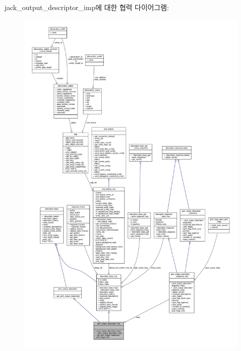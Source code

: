 jack\+\_\+output\+\_\+descriptor\+\_\+imp에 대한 협력 다이어그램\+:
\nopagebreak
\begin{figure}[H]
\begin{center}
\leavevmode
\includegraphics[width=350pt]{classavdecc__lib_1_1jack__output__descriptor__imp__coll__graph}
\end{center}
\end{figure}

